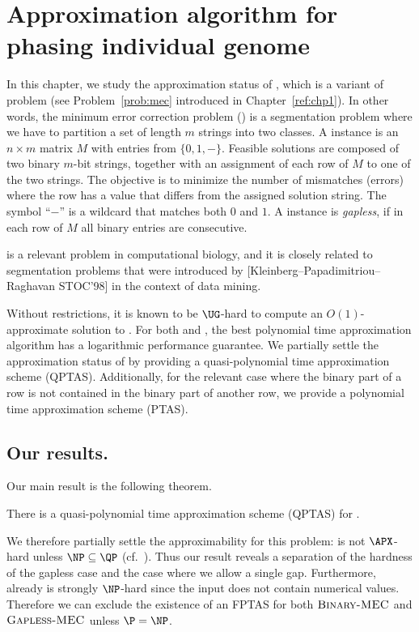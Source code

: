 \chapter{Approximation algorithm for phasing individual genome}

In this chapter, we study the approximation status of \GMEC, which is a variant of \MEC problem (see Problem~\ref{prob:mec} introduced in Chapter~\ref{ref:chp1}).
In other words, the minimum error correction problem (\MEC) is a segmentation problem where we have to partition a set of length $m$ strings into two classes.
A \MEC instance is an $n \times m$ matrix $M$ with entries from $\{0,1,-\}$. 
    Feasible solutions are composed of two binary $m$-bit strings, together with an assignment of each row of $M$ to one of the two strings.
    The objective is to minimize the number of mismatches (errors) where the row has a value that differs from the assigned solution string.
    The symbol ``$-$'' is a wildcard that matches both $0$ and $1$.
    A \MEC instance is \textit{gapless}, if in each row of $M$ all binary entries are consecutive.

 \GMEC is a relevant problem in computational biology, and it is closely related to segmentation problems that were introduced by {[}Kleinberg--Papadimitriou--Raghavan STOC'98{]} in the context of data mining.
 
     Without restrictions, it is known to be $\UG$-hard \citep{trevisan2012khot} to compute an $O(1)$-approximate solution to \MEC. For both \MEC and \GMEC, the best polynomial time approximation algorithm has a logarithmic performance guarantee.
    We partially settle the approximation status of \GMEC by providing a quasi-polynomial time approximation scheme (QPTAS).
    Additionally, for the relevant case where the binary part of a row is not contained in the binary part of another row, we provide a polynomial time approximation scheme (PTAS).

\section{Our results.}
Our main result is the following theorem.
\begin{theorem}\label{thm:qptas}
    There is a quasi-polynomial time approximation scheme (QPTAS) for \GMEC.
\end{theorem}
We therefore partially settle the approximability for this problem: \GMEC is not $\APX$-hard unless $\NP \subseteq \QP$ (cf.~\cite{RS09_approximation}).
Thus our result reveals a separation of the hardness of the gapless case and the case where we allow a single gap.
Furthermore, already \BMEC is strongly $\NP$-hard since the input does not contain numerical values. 
Therefore we can exclude the existence of an FPTAS for both $\textsc{Binary-MEC}$ and $\textsc{Gapless-MEC}$ unless $\P = \NP$.

